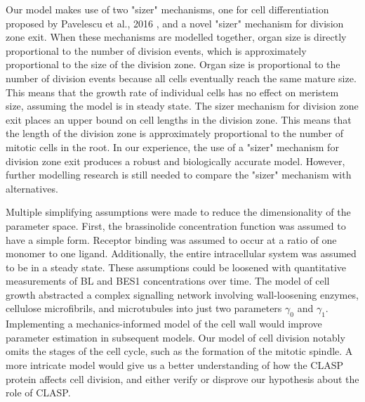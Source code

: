 \documentclass[referee,pdflatex,sn-mathphys-num]{sn-jnl}
\begin{document}
Our model makes use of two "sizer" mechanisms, one for cell differentiation proposed by Pavelescu et al., 2016 \cite{pavelescu2016}, and a novel "sizer" mechanism for division zone exit.
When these mechanisms are modelled together, organ size is directly proportional to the number of division events, which is approximately proportional to the size of the division zone.
Organ size is proportional to the number of division events because all cells eventually reach the same mature size.
This means that the growth rate of individual cells has no effect on meristem size, assuming the model is in steady state.
The sizer mechanism for division zone exit places an upper bound on cell lengths in the division zone.
This means that the length of the division zone is approximately proportional to the number of mitotic cells in the root.
In our experience, the use of a "sizer" mechanism for division zone exit produces a robust and biologically accurate model.
However, further modelling research is still needed to compare the "sizer" mechanism with alternatives.
 
Multiple simplifying assumptions were made to reduce the dimensionality of the parameter space.
First, the brassinolide concentration function was assumed to have a simple form.
Receptor binding was assumed to occur at a ratio of one monomer to one ligand.
Additionally, the entire intracellular system was assumed to be in a steady state.
These assumptions could be loosened with quantitative measurements of BL and BES1 concentrations over time.
The model of cell growth abstracted a complex signalling network involving wall-loosening enzymes, cellulose microfibrils, and microtubules \cite{smithers2024} into just two parameters $\gamma_{0}$ and $\gamma_{1}$.
Implementing a mechanics-informed model of the cell wall would improve parameter estimation in subsequent models.
Our model of cell division notably omits the stages of the cell cycle, such as the formation of the mitotic spindle.
A more intricate model would give us a better understanding of how the CLASP protein affects cell division, and either verify or disprove our hypothesis about the role of CLASP.
\end{document}

